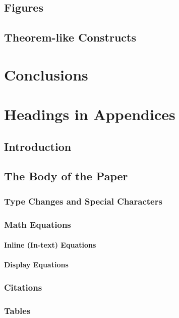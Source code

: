 \documentclass[sigconf]{acmart}
\begin{document}
\subsection{Figures}

\subsection{Theorem-like Constructs}




\section{Conclusions}




\appendix

\section{Headings in Appendices}

\subsection{Introduction}
\subsection{The Body of the Paper}
\subsubsection{Type Changes and  Special Characters}
\subsubsection{Math Equations}
\paragraph{Inline (In-text) Equations}
\paragraph{Display Equations}
\subsubsection{Citations}
\subsubsection{Tables}
\end{document}
